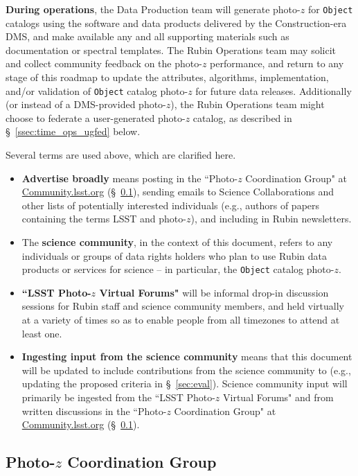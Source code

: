 \documentclass[DM,authoryear,toc]{lsstdoc}
\begin{document}
{\bf During operations}, the Data Production team will generate photo-$z$ for {\tt Object} catalogs using the software and data products delivered by the Construction-era DMS, and make available any and all supporting materials such as documentation or spectral templates.
The Rubin Operations team may solicit and collect community feedback on the photo-$z$ performance, and return to any stage of this roadmap to update the attributes, algorithms, implementation, and/or validation of {\tt Object} catalog photo-$z$ for future data releases.
Additionally (or instead of a DMS-provided photo-$z$), the Rubin Operations team might choose to federate a user-generated photo-$z$ catalog, as described in \S~\ref{ssec:time_ops_ugfed} below.

Several terms are used above, which are clarified here.
\begin{itemize}
\item {\bf Advertise broadly} means posting in the ``Photo-$z$ Coordination Group" at \url{Community.lsst.org} (\S~\ref{ssec:time_pzcoord}), sending emails to Science Collaborations and other lists of potentially interested individuals (e.g., authors of papers containing the terms LSST and photo-$z$), and including in Rubin newsletters. \\
\item The {\bf science community}, in the context of this document, refers to any individuals or groups of data rights holders who plan to use Rubin data products or services for science -- in particular, the {\tt Object} catalog photo-$z$. \\
\item {\bf ``LSST Photo-$z$ Virtual Forums"} will be informal drop-in discussion sessions for Rubin staff and science community members, and held virtually at a variety of times so as to enable people from all timezones to attend at least one. \\
\item {\bf Ingesting input from the science community} means that this document will be updated to include contributions from the science community to (e.g., updating the proposed criteria in \S~\ref{sec:eval}).
Science community input will primarily be ingested from the ``LSST Photo-$z$ Virtual Forums" and from written discussions in the ``Photo-$z$ Coordination Group" at \url{Community.lsst.org} (\S~\ref{ssec:time_pzcoord}).
\end{itemize}

\subsection{Photo-$z$ Coordination Group}\label{ssec:time_pzcoord}
\end{document}
